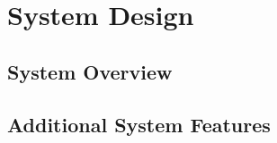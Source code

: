 \section{System Design}
\label{chap:sysdesign}

\subsection{System Overview}

\subsection{Additional System Features}
